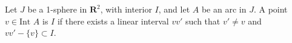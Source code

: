 Let $J$ be a 1-sphere in $\mathbf{R}^2$, with interior $I$, and let $A$ be an arc in $J$. A point $v \in \text{Int } A$ is  $I$ if there exists a linear interval $vv'$ such that $v' \neq v$ and $vv' - \{v\} \subset I$.
